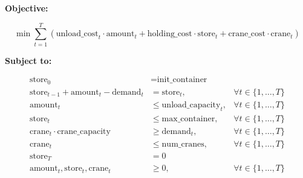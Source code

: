 \documentclass{article}
\begin{document}
\textbf{Objective:}

\[
\min \sum_{t=1}^{T} \left( \text{unload\_cost}_{t} \cdot \text{amount}_{t} + \text{holding\_cost} \cdot \text{store}_{t} + \text{crane\_cost} \cdot \text{crane}_{t} \right)
\]

\textbf{Subject to:}

\begin{align*}
\text{store}_{0} &= \text{init\_container} \\
\text{store}_{t-1} + \text{amount}_{t} - \text{demand}_{t} &= \text{store}_{t}, & \forall t \in \{1, \ldots, T\} \\
\text{amount}_{t} &\leq \text{unload\_capacity}_{t}, & \forall t \in \{1, \ldots, T\} \\
\text{store}_{t} &\leq \text{max\_container}, & \forall t \in \{1, \ldots, T\} \\
\text{crane}_{t} \cdot \text{crane\_capacity} &\geq \text{demand}_{t}, & \forall t \in \{1, \ldots, T\} \\
\text{crane}_{t} &\leq \text{num\_cranes}, & \forall t \in \{1, \ldots, T\} \\
\text{store}_{T} &= 0 \\
\text{amount}_{t}, \text{store}_{t}, \text{crane}_{t} &\geq 0, & \forall t \in \{1, \ldots, T\}
\end{align*}
\end{document}
